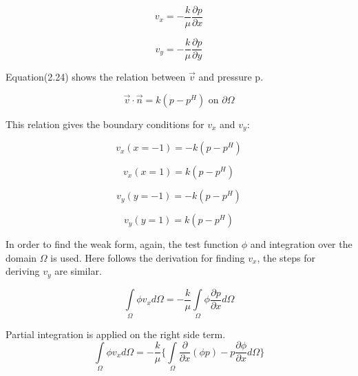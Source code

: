 \documentclass[a4paper]{report}
\begin{document}
\begin{equation}
v_x=-\frac{k}{\mu}\frac{\partial p}{\partial x}
\end{equation}


\begin{equation}
v_y=-\frac{k}{\mu}\frac{\partial p}{\partial y}
\end{equation}

Equation(2.24) shows the relation between $\vec{v}$ and pressure p.

\begin{equation}
\vec{v}\cdot\vec{n}=k(p-p^H)\text{ on }\partial\Omega
\end{equation}

This relation gives the boundary conditions for $v_x$ and $v_y$:

\begin{equation}
v_x(x=-1)=-k(p-p^H)
\end{equation}


\begin{equation}
v_x(x=1)=k(p-p^H)
\end{equation}


\begin{equation}
v_y(y=-1)=-k(p-p^H)
\end{equation}


\begin{equation}
v_y(y=1)=k(p-p^H)
\end{equation}

%
%
In order to find the weak form, again, the test function $\phi$ and integration over the domain $\Omega$ is used. Here follows the derivation for finding $v_x$, the steps for deriving $v_y$ are similar.

\begin{equation}
\int\limits_{\Omega}\phi v_x d\Omega=-\frac{k}{\mu}\int\limits_{\Omega}\phi\frac{\partial p}{\partial x}d\Omega
\end{equation}

Partial integration is applied on the right side term.
\begin{equation}
\int\limits_{\Omega}\phi v_x d\Omega=  -\frac{k}{\mu}\{\int\limits_{\Omega}\frac{\partial }{\partial x}(\phi p)-p\frac{\partial \phi}{\partial x}d\Omega\}
\end{equation}
\end{document}
